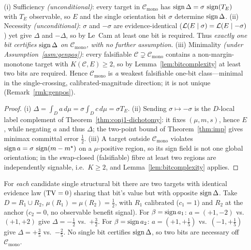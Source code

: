 \begin{theorem}\label{thm:cmono-weakest}
\textnormal{(i) Sufficiency \emph{(unconditional)}:} every target in $\mathcal C_{\mathrm{mono}}$ has
$\operatorname{sign}\Delta=\sigma\,\operatorname{sign}(T_E)$ with $T_E$ observable, so $E$ and the single orientation bit
$\sigma$ determine $\operatorname{sign}\Delta$.
\textnormal{(ii) Necessity \emph{(unconditional)}:} $\sigma$ and $-\sigma$ are evidence-identical
($\mathcal{L}(E\mid\sigma)=\mathcal{L}(E\mid-\sigma)$) yet give $\Delta$ and $-\Delta$, so by Le~Cam at least
one bit is required. Thus \emph{exactly one bit certifies $\operatorname{sign}\Delta$ on
$\mathcal C_{\mathrm{mono}}$, with no further assumption}.
\textnormal{(iii) Minimality \emph{(under Assumption~\ref{asm:genpos})}:} every falsifiable
$\mathcal C\supsetneq\mathcal C_{\mathrm{mono}}$ contains a non-margin-monotone target with
$K(\mathcal C,E)\ge2$, so by Lemma~\ref{lem:bitcomplexity} at least two bits are required. Hence
$\mathcal C_{\mathrm{mono}}$ is \emph{a} weakest falsifiable one-bit class---minimal in the
single-crossing, calibrated-magnitude direction; it is not unique (Remark~\ref{rmk:genpos}).
\end{theorem}
\begin{proof}
(i) $\Delta=\int_D a\,d\mu=\sigma\int_D c\,d\mu=\sigma T_E$. (ii) Sending $\sigma\mapsto-\sigma$ is
the $D$-local label complement of Theorem~\ref{thm:conj1-dichotomy}: it fixes $(\mu,m,s)$, hence
$E$, while negating $a$ and thus $\Delta$; the two-point bound of Theorem~\ref{thm:imp} gives
minimax committal error $\tfrac12$. (iii) A target outside $\mathcal C_{\mathrm{mono}}$ violates
$\operatorname{sign} a=\sigma\,\operatorname{sign}(m-m^\star)$ on a $\mu$-positive region, so its sign field is not one global
orientation; in the swap-closed (falsifiable) fibre at least two regions are independently
signable, i.e.\ $K\ge2$, and Lemma~\ref{lem:bitcomplexity} applies.
\end{proof}

\begin{proposition}\label{prop:cmono-witness}
For \emph{each} candidate single structural bit there are two targets with identical evidence law
($\mathrm{TV}=0$) sharing that bit's value but with opposite $\operatorname{sign}\Delta$. Take $D=R_1\cup R_2$,
$\mu(R_1)=\mu(R_2)=\tfrac12$, with $R_1$ calibrated ($c_1{=}1$) and $R_2$ at the anchor
($c_2{=}0$, no observable benefit signal). For $\beta=\operatorname{sign} a_1$: $a=(+1,-2)$ vs.\ $(+1,+2)$ give
$\Delta=-\tfrac12$ vs.\ $+\tfrac32$. For $\beta=\operatorname{sign} a_2$: $a=(+1,+\tfrac15)$ vs.\
$(-1,+\tfrac15)$ give $\Delta=+\tfrac35$ vs.\ $-\tfrac25$. No single bit certifies $\operatorname{sign}\Delta$,
so two bits are necessary off $\mathcal C_{\mathrm{mono}}$.
\end{proposition}

